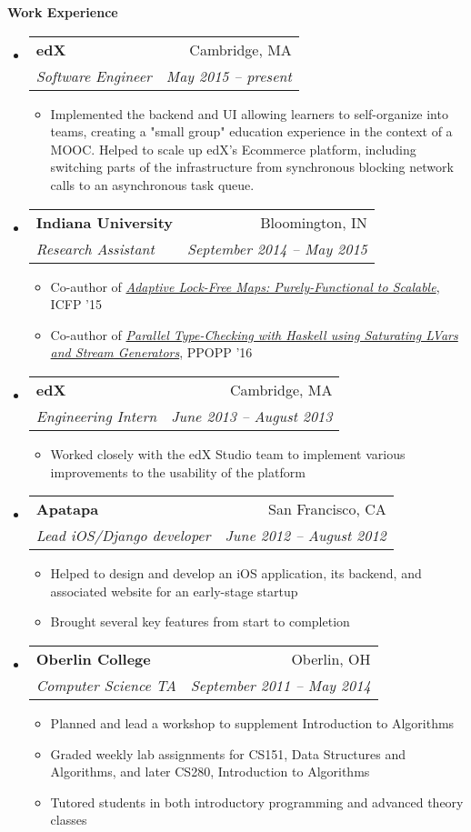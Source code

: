 \documentclass[letterpaper,11pt]{article}
\makeatletter
\newcommand{\resitem}[1]{\item #1 \vspace{-2pt}}
\newcommand{\resheading}[1]{{\large\colorbox{mygrey}{\begin{minipage}{\textwidth}{\textbf{#1\vphantom{p\^{E}}}}\end{minipage}}}}
\newcommand{\ressubheading}[4]{
  \begin{tabular*}{6.5in}{l@{\extracolsep{\fill}}r}
    \textbf{#1} & #2 \\
    \textit{#3} & \textit{#4} \\
  \end{tabular*}\vspace{-6pt}}
\makeatother
\begin{document}
\resheading{Work Experience}
\begin{itemize}
\item
  \ressubheading{edX}{Cambridge, MA}{Software Engineer}{May 2015 -- present}
  \begin{itemize}
  \resitem{Implemented the backend and UI allowing learners to self-organize into teams, creating a "small group" education experience in the context of a MOOC. Helped to scale up edX's Ecommerce platform, including switching parts of the infrastructure from synchronous blocking network calls to an asynchronous task queue.}
  \end{itemize}
\item
  \ressubheading{Indiana University}{Bloomington, IN}{Research Assistant}{September 2014 -- May 2015}
  \begin{itemize}
  \resitem{Co-author of \href{http://www.cs.indiana.edu/~rrnewton/papers/icfp15_adaptive_data.pdf}{\textit{Adaptive Lock-Free Maps: Purely-Functional to Scalable}}, ICFP '15}
  \resitem{Co-author of \href{https://dl.acm.org/citation.cfm?id=2851142}{\textit{Parallel Type-Checking with Haskell using Saturating LVars and Stream Generators}}, PPOPP '16}
  \end{itemize}
\item
  \ressubheading{edX}{Cambridge, MA}{Engineering Intern}{June 2013 -- August 2013}
  \begin{itemize}
  \resitem{Worked closely with the edX Studio team to implement various improvements to the usability of the platform}
  \end{itemize}
\item
  \ressubheading{Apatapa}{San Francisco, CA}{Lead iOS/Django developer}{June 2012 -- August 2012}
  \begin{itemize}
    \resitem{Helped to design and develop an iOS application, its backend, and associated website for an early-stage startup}
    \resitem{Brought several key features from start to completion}
  \end{itemize}
\item
  \ressubheading{Oberlin College}{Oberlin, OH}{Computer Science TA}{September 2011 -- May 2014}
  \begin{itemize}
    \resitem{Planned and lead a workshop to supplement Introduction to Algorithms}
    \resitem{Graded weekly lab assignments for CS151, Data Structures and Algorithms, and later CS280, Introduction to Algorithms}
    \resitem{Tutored students in both introductory programming and advanced theory classes}
  \end{itemize}
\end{itemize}
\end{document}
